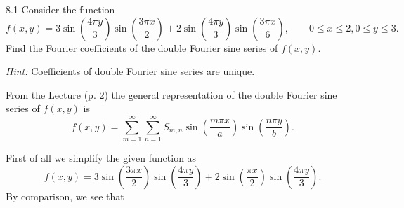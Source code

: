 
\begin{problem}{8.1}
  Consider the function
  \[ 
  f(x,y) = 3 \sin \left( \frac{4 \pi y}{3} \right) \sin \left( \frac{3 \pi x}{2} \right) + 2 \sin \left( \frac{4 \pi y}{3} \right) \sin \left( \frac{3 \pi x}{6} \right), \qquad 0 \leq x \leq 2, 0 \leq y \leq 3
  .\]
  Find the Fourier coefficients of the double Fourier sine series of $f(x,y)$.

  \textit{Hint:} Coefficients of double Fourier sine series are unique.
\end{problem}

\begin{derivation}
  From the Lecture (p. 2) the general representation of the double Fourier sine series of $f(x,y)$ is
  \begin{equation*}
    f(x,y) = \sum_{m = 1}^{\infty} \sum_{n = 1}^{\infty} S_{m,n} \sin \left( \frac{m \pi x}{a} \right) \sin \left( \frac{n \pi y}{b} \right)
  .\end{equation*}
  
  First of all we simplify the given function as
  \begin{equation*}
    f(x,y) = 3 \sin \left( \frac{3 \pi x}{2} \right)\sin \left( \frac{4 \pi y}{3} \right) + 2 \sin \left( \frac{\pi x}{2} \right) \sin \left( \frac{4\pi y}{3} \right)
  .\end{equation*}
  By comparison, we see that
\end{derivation}


